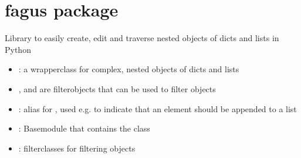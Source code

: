 \documentclass[a4paper,10pt,english]{sphinxmanual}
\begin{document}
\chapter{fagus package}
\label{\detokenize{fagus:module-fagus}}\label{\detokenize{fagus:fagus-package}}\label{\detokenize{fagus::doc}}
\sphinxAtStartPar
Library to easily create, edit and traverse nested objects of dicts and lists in Python
\begin{description}
\begin{itemize}
\item {}
\sphinxAtStartPar
{\hyperref[\detokenize{fagus:fagus.Fagus}]{}}: a wrapper\sphinxhyphen{}class for complex, nested objects of dicts and lists

\item {}
\sphinxAtStartPar
{\hyperref[\detokenize{fagus.filters:fagus.filters.Fil}]{}}, {\hyperref[\detokenize{fagus.filters:fagus.filters.CFil}]{}} and {\hyperref[\detokenize{fagus.filters:fagus.filters.VFil}]{}} are filter\sphinxhyphen{}objects that can
be used to filter {\hyperref[\detokenize{fagus:fagus.Fagus}]{}}\sphinxhyphen{}objects

\item {}
\sphinxAtStartPar
{}: alias for , used e.g. to indicate that an element should be appended to
a list

\end{itemize}

\begin{itemize}
\item {}
\sphinxAtStartPar
{\hyperref[\detokenize{fagus.fagus:module-fagus.fagus}]{}}: Base\sphinxhyphen{}module that contains the {\hyperref[\detokenize{fagus:fagus.Fagus}]{}}\sphinxhyphen{}class

\item {}
\sphinxAtStartPar
{\hyperref[\detokenize{fagus.filters:module-fagus.filters}]{}}: filter\sphinxhyphen{}classes for filtering {\hyperref[\detokenize{fagus:fagus.Fagus}]{}}\sphinxhyphen{}objects


\end{itemize}
\end{description}
\end{document}
